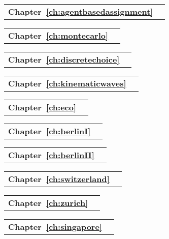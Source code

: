 \begin{tabular}[width=0.48\textwidth]{@{}l l}
\textbf{Chapter~\ref{ch:agentbasedassignment}} &  \\
\end{tabular}

\begin{tabular}[width=0.48\textwidth]{@{}l l}
\textbf{Chapter~\ref{ch:montecarlo}} &  \\
\end{tabular}

\begin{tabular}[width=0.48\textwidth]{@{}l l}
\textbf{Chapter~\ref{ch:discretechoice}} &  \\
\end{tabular}

\begin{tabular}[width=0.48\textwidth]{@{}l l}
\textbf{Chapter~\ref{ch:kinematicwaves}} &  \\
\end{tabular}

\begin{tabular}[width=0.48\textwidth]{@{}l l}
\textbf{Chapter~\ref{ch:eco}} &  \\
\end{tabular}

\begin{tabular}[width=0.48\textwidth]{@{}l l}
\textbf{Chapter~\ref{ch:berlinI}} &  \\
\end{tabular}

\begin{tabular}[width=0.48\textwidth]{@{}l l}
\textbf{Chapter~\ref{ch:berlinII}} &  \\
\end{tabular}

\begin{tabular}[width=0.48\textwidth]{@{}l l}
\textbf{Chapter~\ref{ch:switzerland}} &  \\
\end{tabular}

\begin{tabular}[width=0.48\textwidth]{@{}l l}
\textbf{Chapter~\ref{ch:zurich}} &  \\
\end{tabular}

\begin{tabular}[width=0.48\textwidth]{@{}l l}
\textbf{Chapter~\ref{ch:singapore}} &  \\
\end{tabular}

